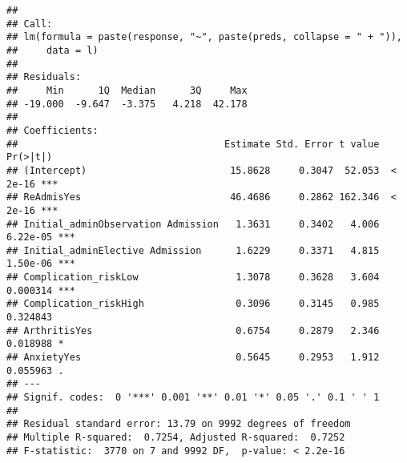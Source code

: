 \documentclass[
]{article}
\newenvironment{Shaded}{\begin{snugshade}}{\end{snugshade}}
\newcommand{\CommentTok}[1]{\textcolor[rgb]{0.56,0.35,0.01}{\textit{#1}}}
\newcommand{\FunctionTok}[1]{\textcolor[rgb]{0.00,0.00,0.00}{#1}}
\newcommand{\NormalTok}[1]{#1}
\newcommand{\SpecialCharTok}[1]{\textcolor[rgb]{0.00,0.00,0.00}{#1}}
\begin{document}
\begin{Shaded}
\end{Shaded}

\begin{verbatim}
## 
## Call:
## lm(formula = paste(response, "~", paste(preds, collapse = " + ")), 
##     data = l)
## 
## Residuals:
##     Min      1Q  Median      3Q     Max 
## -19.000  -9.647  -3.375   4.218  42.178 
## 
## Coefficients:
##                                    Estimate Std. Error t value Pr(>|t|)    
## (Intercept)                         15.8628     0.3047  52.053  < 2e-16 ***
## ReAdmisYes                          46.4686     0.2862 162.346  < 2e-16 ***
## Initial_adminObservation Admission   1.3631     0.3402   4.006 6.22e-05 ***
## Initial_adminElective Admission      1.6229     0.3371   4.815 1.50e-06 ***
## Complication_riskLow                 1.3078     0.3628   3.604 0.000314 ***
## Complication_riskHigh                0.3096     0.3145   0.985 0.324843    
## ArthritisYes                         0.6754     0.2879   2.346 0.018988 *  
## AnxietyYes                           0.5645     0.2953   1.912 0.055963 .  
## ---
## Signif. codes:  0 '***' 0.001 '**' 0.01 '*' 0.05 '.' 0.1 ' ' 1
## 
## Residual standard error: 13.79 on 9992 degrees of freedom
## Multiple R-squared:  0.7254, Adjusted R-squared:  0.7252 
## F-statistic:  3770 on 7 and 9992 DF,  p-value: < 2.2e-16
\end{verbatim}

\begin{Shaded}
\end{Shaded}
\end{document}
